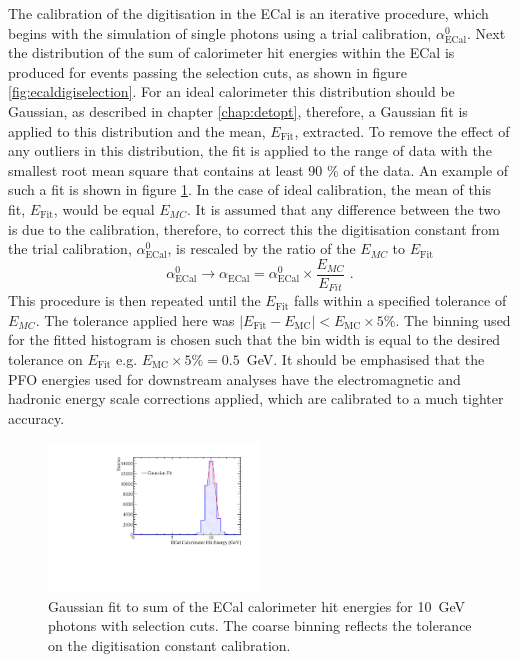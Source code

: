 The calibration of the digitisation in the ECal is an iterative procedure, which begins with the simulation of single photons using a trial calibration, $\alpha^{0}_{\text{ECal}}$.  Next the distribution of the sum of calorimeter hit energies within the ECal is produced for events passing the selection cuts, as shown in figure \ref{fig:ecaldigiselection}.  For an ideal calorimeter this distribution should be Gaussian, as described in chapter \ref{chap:detopt}, therefore, a Gaussian fit is applied to this distribution and the mean, $E_{\text{Fit}}$, extracted.  To remove the effect of any outliers in this distribution, the fit is applied to the range of data with the smallest root mean square that contains at least 90 \% of the data.  An example of such a fit is shown in figure \ref{fig:ecaldigifit}.  In the case of ideal calibration, the mean of this fit, $E_{\text{Fit}}$, would be equal $E_{MC}$.  It is assumed that any difference between the two is due to the calibration, therefore, to correct this the digitisation constant from the trial calibration, $\alpha^{0}_{\text{ECal}}$, is rescaled by the ratio of the $E_{MC}$ to $E_{\text{Fit}}$
%
\begin{equation}
\alpha^{0}_{\text{ECal}} \rightarrow \alpha_{\text{ECal}} = \alpha^{0}_{\text{ECal}} \times \frac{E_{MC}}{E_{Fit}}\text{ .}
\end{equation}
%
This procedure is then repeated until the $E_{\text{Fit}}$ falls within a specified tolerance of $E_{MC}$.  The tolerance applied here was $|E_{\text{Fit}} - E_{\text{MC}}| < E_{\text{MC}} \times 5 \%$.  The binning used for the fitted histogram is chosen such that the bin width is equal to the desired tolerance on $E_{\text{Fit}}$ e.g. $E_{\text{MC}} \times 5 \% = 0.5$~GeV.  It should be emphasised that the PFO energies used for downstream analyses have the electromagnetic and hadronic energy scale corrections applied, which are calibrated to a much tighter accuracy.

\begin{figure}[h!]
\includegraphics[width=0.5\textwidth]{EnergyEstimators/Plots/Calibration/Digitsation/ECal/DigitisationECalFit.pdf}
\caption[Gaussian fit to sum of the ECal calorimeter hit energies for 10~GeV photons with selection cuts.  The coarse binning reflects the tolerance on the digitisation constant calibration.]{Gaussian fit to sum of the ECal calorimeter hit energies for 10~GeV photons with selection cuts.  The coarse binning reflects the tolerance on the digitisation constant calibration.}
\label{fig:ecaldigifit}
\end{figure}

